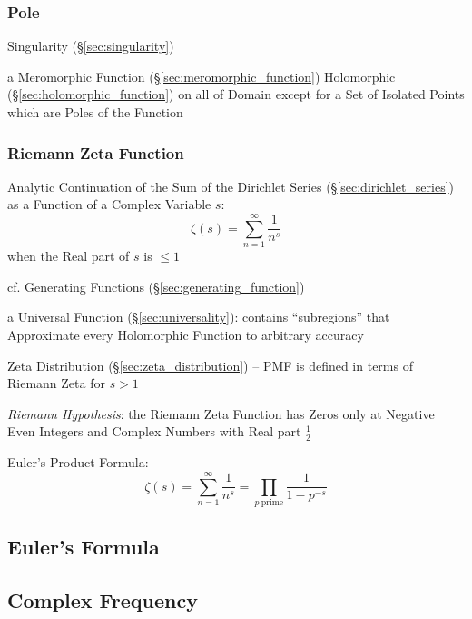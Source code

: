 \subsubsection{Pole}\label{sec:complex_pole}

Singularity (\S\ref{sec:singularity})

a Meromorphic Function (\S\ref{sec:meromorphic_function}) Holomorphic
(\S\ref{sec:holomorphic_function}) on all of Domain except for a Set of
Isolated Points which are Poles of the Function



\subsubsection{Riemann Zeta Function}\label{sec:riemann_zeta}

Analytic Continuation of the Sum of the Dirichlet Series
(\S\ref{sec:dirichlet_series}) as a Function of a Complex Variable $s$:
\[
  \zeta(s) = \sum_{n=1}^\infty \frac{1}{n^s}
\]
when the Real part of $s$ is $\leq 1$

\fist cf. Generating Functions (\S\ref{sec:generating_function})

a Universal Function (\S\ref{sec:universality}): contains ``subregions'' that
Approximate every Holomorphic Function to arbitrary accuracy

Zeta Distribution (\S\ref{sec:zeta_distribution}) -- PMF is defined in terms of
Riemann Zeta for $s > 1$

\emph{Riemann Hypothesis}: the Riemann Zeta Function has Zeros only at Negative
Even Integers and Complex Numbers with Real part $\frac{1}{2}$

Euler's Product Formula:
\[
  \zeta(s) = \sum_{n=1}^\infty \frac{1}{n^s}
    = \prod_{p\ \text{prime}} \frac{1}{1 - p^{-s}}
\]



\subsection{Euler's Formula}\label{sec:eulers_formula}

\subsection{Complex Frequency}\label{sec:complex_frequency}

